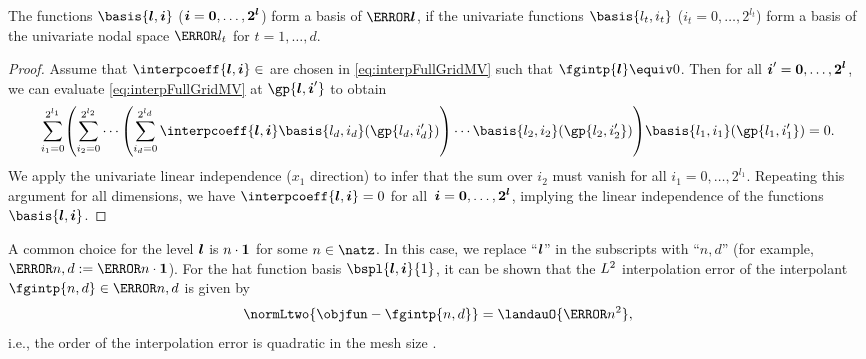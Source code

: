 \vspace*{\fill}
\pagebreak

\begin{lemma}
  \label{lemma:tensorProductLinearIndependence}
  The functions $\basis{\*l,\*i}$ (${\boldsymbol{i}} = {\boldsymbol{0}}, \dotsc, {\boldsymbol{2}}^{{\boldsymbol{l}}}$)
  form a basis of $\ns{\*l}$, if the univariate functions
  $\basis{l_t,i_t}$ ($i_t = 0, \dotsc, 2^{l_t}$)
  form a basis of the univariate nodal space $\ns{l_t}$
  for $t = 1, \dotsc, d$.
\end{lemma}
\begin{proof}
  Assume that $\interpcoeff{\*l,\*i} \in \real$ are chosen in \eqref{eq:interpFullGridMV}
  such that $\fgintp{\*l} \equiv 0$.
  Then for all ${\boldsymbol{i}}' = {\boldsymbol{0}}, \dotsc, {\boldsymbol{2}}^{{\boldsymbol{l}}}$,
  we can evaluate \eqref{eq:interpFullGridMV} at $\gp{\*l,\*i'}$ to obtain
  \begin{equation}
    \sum_{i_1=0}^{2^{l_1}}
    \paren*{
      \sum_{i_2=0}^{2^{l_2}} \dotsb \paren*{
        \sum_{i_d=0}^{2^{l_d}}
        \interpcoeff{\*l,\*i} \basis{l_d,i_d}(\gp{l_d,i_d'})
      } \dotsb \basis{l_2,i_2}(\gp{l_2,i_2'})
    } \basis{l_1,i_1}(\gp{l_1,i_1'})
    = 0.
  \end{equation}
  We apply the univariate linear independence ($x_1$ direction) to infer
  that the sum over $i_2$ must vanish for all $i_1 = 0, \dotsc, 2^{l_1}$.
  Repeating this argument for all dimensions, we have
  $\interpcoeff{\*l,\*i} = 0$ for all~${\boldsymbol{i}} = {\boldsymbol{0}}, \dotsc, {\boldsymbol{2}}^{{\boldsymbol{l}}}$,
  implying the linear independence of the functions $\basis{\*l,\*i}$.
\end{proof}

A common choice for the level ${\boldsymbol{l}}$ is $n \cdot {\boldsymbol{1}}$ for some $n \in \natz$.
In this case, we replace ``${\boldsymbol{l}}$'' in the subscripts with ``$n{,}d$''
(for example, $\ns{n,d} := \ns{n \cdot \*1}$).
For the hat function basis $\bspl{\*l,\*i}{1}$,
it can be shown that the $L^2$ interpolation error of the interpolant
$\fgintp{n,d} \in \ns{n,d}$ is given by
\begin{equation}
  \normLtwo{\objfun - \fgintp{n,d}} = \landauO{\ms{n}^2},
\end{equation}
i.e., the order of the interpolation error is quadratic in the mesh size
.
